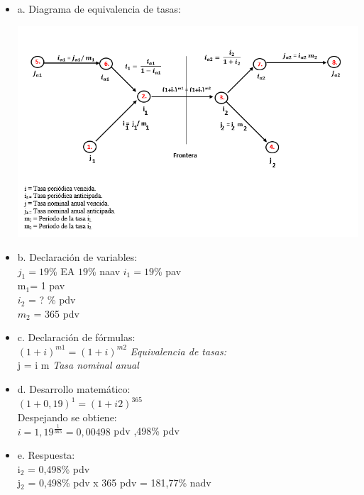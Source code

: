 \begin{itemize}
    \item a. Diagrama de equivalencia de tasas:\\
\begin{center}
	\includegraphics[height = 9.0 cm]{general}\\
\end{center}   
	\item b. Declaración de variables:\\
	
	
	$j_{1} = 19$\% EA \equiv $19$\% naav \Rightarrow $i_{1} = 19$\% pav\\
	m$_{1}$= 1 pav\\
    $i_{2}$ = ? \% pdv \\
    $m_{2}$ = 365 pdv \\
	
	\item c. Declaración de fórmulas:\\
	 $(1+i)^{m1} = (1+i)^{m2}$ \hspace{70 pt}\textit{Equivalencia de tasas:}\\
	j = i m \hspace{15 pt}\textit{Tasa nominal anual}\\
	
	\item d. Desarrollo matemático:\\
	
   
    $(1+0,19)^{1} = (1+i2)^{365}$ \\
	Despejando se obtiene:\\
	
	$i = 1,19 ^{\frac{1}{365}} = 0,00498$ pdv ,498\% pdv\\
	
	\item e. Respuesta:\\
	
	i$_{2}$ = 0,498\% pdv\\
	j$_{2}$ = 0,498\% pdv x 365 pdv = 181,77\% nadv\\
	
\end{itemize}



